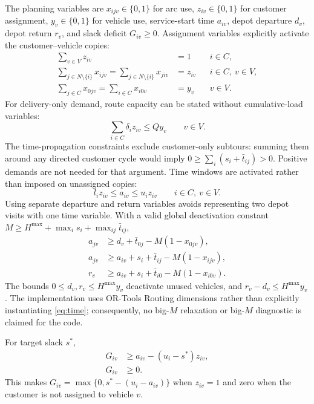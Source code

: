 \documentclass[11pt,a4paper]{article}
\begin{document}
The planning variables are $x_{ijv}\in\{0,1\}$ for arc use,
$z_{iv}\in\{0,1\}$ for customer assignment, $y_v\in\{0,1\}$ for vehicle use,
service-start time $a_{iv}$, depot departure $d_v$, depot return $r_v$, and
slack deficit $G_{iv}\geq0$. Assignment variables explicitly activate the
customer--vehicle copies:
\begin{align}
 \sum_{v\in V} z_{iv} &= 1 && i\in C, \\
 \sum_{j\in N\setminus\{i\}}x_{ijv}
   =\sum_{j\in N\setminus\{i\}}x_{jiv} &= z_{iv}
      && i\in C,\ v\in V, \\
 \sum_{j\in C}x_{0jv}=\sum_{i\in C}x_{i0v} &= y_v
      && v\in V.                                            \label{eq:flow}
\end{align}
For delivery-only demand, route capacity can be stated without cumulative-load
variables:
\begin{equation}
 \sum_{i\in C}\delta_i z_{iv}\leq Qy_v \qquad v\in V.       \label{eq:capacity}
\end{equation}
The time-propagation constraints exclude customer-only subtours: summing them
around any directed customer cycle would imply
$0\geq\sum_i(s_i+\bar t_{ij})>0$. Positive demands are not needed for that
argument. Time windows are activated rather than imposed on unassigned copies:
\begin{equation}
 l_i z_{iv}\leq a_{iv}\leq u_i z_{iv}
 \qquad i\in C,\ v\in V.                                   \label{eq:activate}
\end{equation}
Using separate departure and return variables avoids representing two depot
visits with one time variable. With a valid global deactivation constant
$M\geq H^{\max}+\max_i s_i+\max_{ij}\bar t_{ij}$,
\begin{align}
 a_{jv} &\geq d_v+\bar t_{0j}-M(1-x_{0jv}), \\
 a_{jv} &\geq a_{iv}+s_i+\bar t_{ij}-M(1-x_{ijv}), \\
 r_v &\geq a_{iv}+s_i+\bar t_{i0}-M(1-x_{i0v}).              \label{eq:time}
\end{align}
The bounds $0\leq d_v,r_v\leq H^{\max}y_v$ deactivate unused vehicles, and
$r_v-d_v\leq H^{\max}y_v$. The implementation uses OR-Tools Routing
dimensions rather than explicitly instantiating \eqref{eq:time}; consequently,
no big-$M$ relaxation or big-$M$ diagnostic is claimed for the code.

For target slack $s^*$,
\begin{align}
 G_{iv} &\geq a_{iv}-(u_i-s^*)z_{iv}, \\
 G_{iv} &\geq 0.                                            \label{eq:slack}
\end{align}
This makes $G_{iv}=\max\{0,s^*-(u_i-a_{iv})\}$ when $z_{iv}=1$ and zero when
the customer is not assigned to vehicle $v$.
\end{document}

